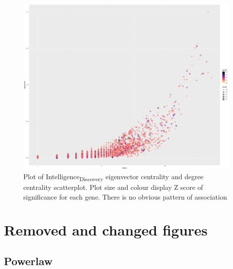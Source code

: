 \begin{figure}
    \centering
    \includegraphics[width=\textwidth]{images/chapter3/ggplot2/correlation_centrality_significance/Rplot_degree_and_eigenvector_z.png}
    \caption{Plot of Intelligence\textsubscript{Discovery} eigenvector centrality and degree centrality scatterplot. Plot size and colour display Z score of significance for each gene. There is no obvious pattern of association}
    \label{fig:my_label}
\end{figure}

\section{Removed and changed figures}


\subsection{Powerlaw}

